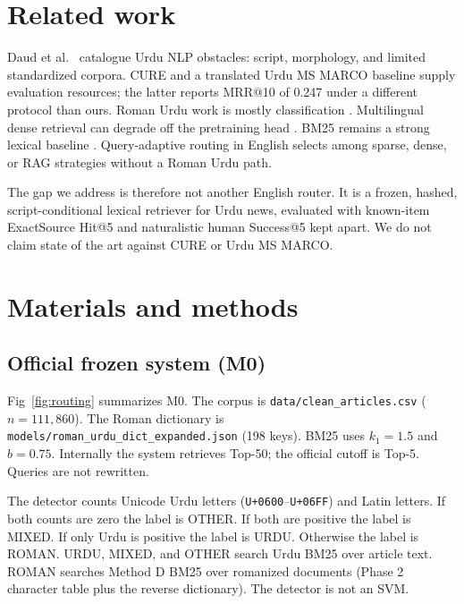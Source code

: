 \documentclass[10pt,letterpaper]{article}
\begin{document}
\section*{Related work}

Daud et al.\ \cite{daud2017urdu} catalogue Urdu NLP obstacles: script, morphology, and limited standardized corpora. CURE \cite{iqbal2021cure} and a translated Urdu MS MARCO baseline \cite{butt2024urdumsmarco} supply evaluation resources; the latter reports MRR@10 of 0.247 under a different protocol than ours. Roman Urdu work is mostly classification \cite{hussain2025qlora,mehmood2020xtreme}. Multilingual dense retrieval can degrade off the pretraining head \cite{wu2024crosslingual,conneau2020xlmr}. BM25 remains a strong lexical baseline \cite{robertson2009bm25}. Query-adaptive routing in English selects among sparse, dense, or RAG strategies \cite{arabzadeh2021predicting,jeong2024adaptiverag,hsu2025dat} without a Roman Urdu path.

The gap we address is therefore not another English router. It is a frozen, hashed, script-conditional lexical retriever for Urdu news, evaluated with known-item ExactSource Hit@5 and naturalistic human Success@5 kept apart. We do not claim state of the art against CURE or Urdu MS MARCO.

\section*{Materials and methods}

\subsection*{Official frozen system (M0)}

Fig~\ref{fig:routing} summarizes M0. The corpus is \texttt{data/clean\_articles.csv} (\(n=111{,}860\)). The Roman dictionary is \texttt{models/roman\_urdu\_dict\_expanded.json} (198 keys). BM25 uses \(k_1=1.5\) and \(b=0.75\). Internally the system retrieves Top-50; the official cutoff is Top-5. Queries are not rewritten.

The detector counts Unicode Urdu letters (\texttt{U+0600}--\texttt{U+06FF}) and Latin letters. If both counts are zero the label is OTHER. If both are positive the label is MIXED. If only Urdu is positive the label is URDU. Otherwise the label is ROMAN. URDU, MIXED, and OTHER search Urdu BM25 over article text. ROMAN searches Method D BM25 over romanized documents (Phase 2 character table plus the reverse dictionary). The detector is not an SVM.
\end{document}
